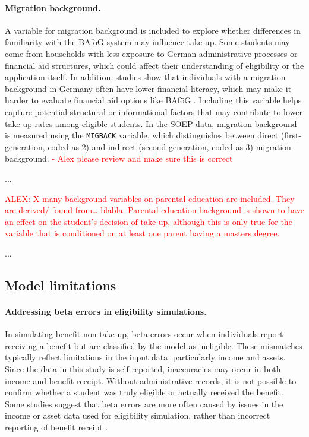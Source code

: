 \paragraph{Migration background.} A variable for migration background is included to explore whether differences in familiarity with the BAföG system may influence take-up. Some students may come from households with less exposure to German administrative processes or financial aid structures, which could affect their understanding of eligibility or the application itself. In addition, studies show that individuals with a migration background in Germany often have lower financial literacy, which may make it harder to evaluate financial aid options like BAföG \citep{Tsegay_2024}. Including this variable helps capture potential structural or informational factors that may contribute to lower take-up rates among eligible students. In the SOEP data, migration background is measured using the \texttt{MIGBACK} variable, which distinguishes between direct (first-generation, coded as 2) and indirect (second-generation, coded as 3) migration background. \textcolor{red}{- Alex please review and make sure this is correct}

...

\textcolor{red}{ALEX: X many background variables on parental education are included. They are derived/ found from… blabla.
Parental education background is shown to have an effect on the student’s decision of take-up, although this is only true for the variable that is conditioned on at least one parent having a masters degree.}

...

\subsection{Model limitations}
\label{subsection:model_limitations}

\paragraph{Addressing beta errors in eligibility simulations.}
In simulating benefit non-take-up, beta errors occur when individuals report receiving a benefit but are classified by the model as ineligible. 
These mismatches typically reflect limitations in the input data, particularly income and assets.
Since the data in this study is self-reported, inaccuracies may occur in both income and benefit receipt.
Without administrative records, it is not possible to confirm whether a student was truly eligible or actually received the benefit. 
Some studies suggest that beta errors are more often caused by issues in the income or asset data used for eligibility simulation, rather than incorrect reporting of benefit receipt \citep{frick_claim_2007, janssens_takemod_2022}. 

